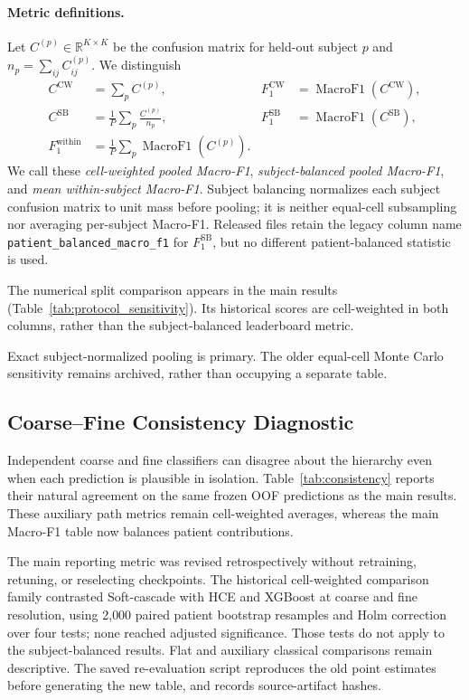 \documentclass{article} %
\begin{document}
\paragraph{Metric definitions.}
Let $C^{(p)}\in\mathbb{R}^{K\times K}$ be the confusion matrix for held-out
subject $p$ and $n_p=\sum_{ij}C^{(p)}_{ij}$. We distinguish
\begin{align}
C^{\mathrm{CW}} &= \sum_p C^{(p)},
&F_1^{\mathrm{CW}} &= \operatorname{MacroF1}(C^{\mathrm{CW}}),\\
C^{\mathrm{SB}} &= \frac{1}{P}\sum_p\frac{C^{(p)}}{n_p},
&F_1^{\mathrm{SB}} &= \operatorname{MacroF1}(C^{\mathrm{SB}}),\\
F_1^{\mathrm{within}} &= \frac{1}{P}\sum_p
\operatorname{MacroF1}(C^{(p)}). &&
\end{align}
We call these \emph{cell-weighted pooled Macro-F1}, \emph{subject-balanced
pooled Macro-F1}, and \emph{mean within-subject Macro-F1}. Subject balancing
normalizes each subject confusion matrix to unit mass before pooling; it is
neither equal-cell subsampling nor averaging per-subject Macro-F1. Released
files retain the legacy column name \texttt{patient\_balanced\_macro\_f1} for
$F_1^{\mathrm{SB}}$, but no different patient-balanced statistic is used.

The numerical split comparison appears in the main results
(Table~\ref{tab:protocol_sensitivity}). Its historical scores are cell-weighted
in both columns, rather than the subject-balanced leaderboard metric.

Exact subject-normalized pooling is primary. The older equal-cell Monte
Carlo sensitivity remains archived, rather than occupying a separate table.

\subsection{Coarse--Fine Consistency Diagnostic}
\label{sec:appendix:consistency}

Independent coarse and fine classifiers can disagree about the hierarchy even
when each prediction is plausible in isolation. Table~\ref{tab:consistency}
reports their natural agreement on the same frozen OOF predictions as the
main results. These auxiliary path metrics remain cell-weighted averages,
whereas the main Macro-F1 table now balances patient contributions.




The main reporting metric was revised retrospectively without retraining,
retuning, or reselecting checkpoints. The historical cell-weighted comparison
family contrasted Soft-cascade with HCE and XGBoost at coarse and fine
resolution, using 2{,}000 paired patient bootstrap resamples and Holm correction
over four tests; none reached adjusted significance. Those tests do not apply
to the subject-balanced results. Flat and auxiliary classical comparisons
remain descriptive. The saved re-evaluation script reproduces the old point
estimates before generating the new table, and records source-artifact hashes.
\end{document}
